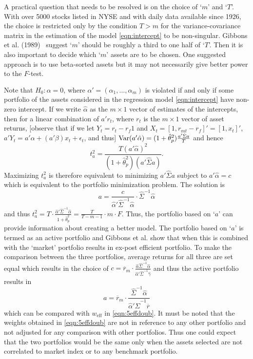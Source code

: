 A practical question that needs to be resolved is on the choice of `$m$' and `$T$'. With over 5000 stocks listed in NYSE and with daily data available since 1926, the choice is restricted only by the condition $T > m$ for the variance-covariance matrix in the estimation of the model \eqref{eqn:intercept} to be non-singular. Gibbons et al. (1989)~\cite{gibbons} suggest `$m$' should be roughly a third to one half of `$T$'. Then it is also important to decide which `$m$' assets are to be chosen. One suggested approach is to use beta-sorted assets but it may not necessarily give better power to the $F$-test. 
	
	
Note that $H_0: \alpha= 0$, where $\alpha'= (\alpha_1, \ldots, \alpha_m)$ is violated if and only if some portfolio of the assets considered in the regression model \eqref{eqn:intercept} have non-zero intercept. If we write $\hat{\alpha}$ as the $m \times 1$ vector of estimates of the intercepts, then for a linear combination of $a' r_t$, where $r_t$ is the $m \times 1$ vector of asset returns, [observe that if we let $Y_t= r_t - r_f1$ and $X_t= [1, r_{mt} - r_f]'= [1, x_t]'$, $a'Y_t= a' \alpha + (a' \beta) x_t + \epsilon_t$, and thus] $\operatorname{Var}(a'\hat{\alpha})= (1 + \hat{\theta}_p^2) \frac{a' \hat{\Sigma}a}{T}$ and hence
	\begin{equation} \label{eqn:smallt}
	t_a^2= \dfrac{T(a'\hat{\alpha})^2}{(1+\hat{\theta}_p^2)(a' \hat{\Sigma} a)}.
	\end{equation}
Maximizing $t_a^2$ is therefore equivalent to minimizing $a' \hat{\Sigma}a$ subject to $a' \hat{\alpha}= c$ which is equivalent to the portfolio minimization problem. The solution is
	\begin{equation} \label{eqn:5a}
	a= \dfrac{c}{\hat{\alpha}' \hat{\Sigma}^{-1} \hat{\alpha}} \cdot \hat{\Sigma}^{-1} \hat{\alpha}
	\end{equation}
and thus $t_a^2= T \cdot \frac{\hat{\alpha}' \hat{\Sigma}^{-1} \hat{\alpha}}{1+\hat{\theta}_p^2}= \frac{T}{T - m - 1} \cdot m \cdot F$. Thus, the portfolio based on `$a$' can provide information about creating a better model. The portfolio based on `$a$' is termed as an active portfolio and Gibbons et al. show that when this is combined with the `market' portfolio results in ex-post efficient portfolio. To make the comparison between the three portfolios, average returns for all three are set equal which results in the choice of $c= \overline{r}_m \cdot \frac{\hat{\alpha} \hat{\Sigma}^{-1} \hat{\alpha}}{\hat{\alpha}' \hat{\Sigma}^{-1} \hat{\gamma}}$ and thus the active portfolio results in 
	\begin{equation} \label{eqn:5a2}
	a= \overline{r}_m \cdot \dfrac{\hat{\Sigma}^{-1} \hat{\alpha}}{\hat{\alpha}' \hat{\Sigma}^{-1} \overline{r}}
	\end{equation}	
which can be compared with $w_{\text{eff}}$ in \eqref{eqn:5effdoub}. It must be noted that the weights obtained in \eqref{eqn:5effdoub} are not in reference to any other portfolio and not adjusted for any comparison with other portfolios. Thus one could expect that the two portfolios would be the same only when the assets selected are not correlated to market index or to any benchmark portfolio. 


